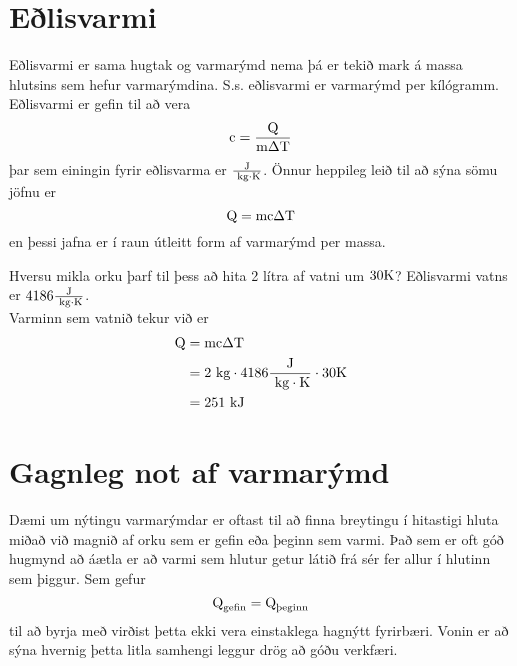 \section{Eðlisvarmi}
Eðlisvarmi er sama hugtak og varmarýmd nema þá er tekið mark á massa hlutsins
sem hefur varmarýmdina. S.s. eðlisvarmi er varmarýmd per kílógramm. Eðlisvarmi er
gefin til að vera
\begin{equation}
	\text{c} = \frac{\text{Q}}{\textrm{m} \Delta\text{T}}
\end{equation}
þar sem einingin fyrir eðlisvarma er $\frac{\textrm{J}}{\textrm{ k}\textrm{g} \cdot \text{K}}$. Önnur heppileg
leið til að sýna sömu jöfnu er
\[
	\text{Q} = \textrm{m} \text{c} \Delta \text{T}
\]
en þessi jafna er í raun útleitt form af varmarýmd per massa.
\begin{formalexample}
Hversu mikla orku þarf til þess að hita 2 lítra af vatni um $30 \text{K}$? 
Eðlisvarmi vatns er $4186 \frac{\textrm{J}}{\textrm{ k}\textrm{g} \cdot \text{K}}$.
\\[4 ex]
Varminn sem vatnið tekur við er
\begin{align*}
	\text{Q} &= \textrm{m} \text{c} \Delta \text{T} \\
		&= 2 \textrm{ k}\textrm{g} \cdot 4186 \frac{\textrm{J}}{\textrm{ k}\textrm{g} \cdot \text{K}} \cdot 30 \text{K} \\
		&= 251 \textrm{ k}\textrm{J} 
\end{align*}
\end{formalexample}

\section{Gagnleg not af varmarýmd}
Dæmi um nýtingu varmarýmdar er oftast til að finna breytingu í hitastigi hluta
miðað við magnið af orku sem er gefin eða þeginn sem varmi. Það sem er oft góð
hugmynd að áætla er að varmi sem hlutur getur látið frá sér fer allur í hlutinn
sem þiggur. Sem gefur
\[
	\text{Q}_\text{gefin} = \text{Q}_\text{þeginn}
\]
til að byrja með virðist þetta ekki vera einstaklega hagnýtt fyrirbæri. Vonin er
að sýna hvernig þetta litla samhengi leggur drög að góðu verkfæri.

